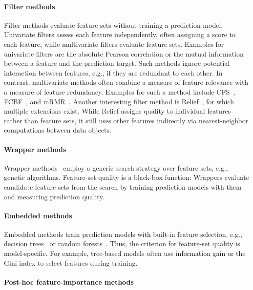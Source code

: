 \documentclass{article}
\theoremstyle{definition}
\begin{document}
\paragraph{Filter methods}

Filter methods evaluate feature sets without training a prediction model.
Univariate filters assess each feature independently, often assigning a score to each feature, while multivariate filters evaluate feature sets.
Examples for univariate filters are the absolute Pearson correlation or the mutual information between a feature and the prediction target.
Such methods ignore potential interaction between features, e.g., if they are redundant to each other.
In contrast, multivariate methods often combine a measure of feature relevance with a measure of feature redundancy.
Examples for such a method include CFS~\cite{hall1999correlation}, FCBF~\cite{yu2003feature}, and mRMR~\cite{peng2005feature}.
Another interesting filter method is Relief~\cite{kira1992feature}, for which multiple extensions exist.
While Relief assigns quality to individual features rather than feature sets, it still uses other features indirectly via nearest-neighbor computations between data objects.

\paragraph{Wrapper methods}

Wrapper methods~\cite{kohavi1997wrappers} employ a generic search strategy over feature sets, e.g., genetic algorithms.
Feature-set quality is a black-box function:
Wrappers evaluate candidate feature sets from the search by training prediction models with them and measuring prediction quality.

\paragraph{Embedded methods}

Embedded methods train prediction models with built-in feature selection, e.g., decision trees~\cite{breiman1984classification} or random forests~\cite{breiman2001random}.
Thus, the criterion for feature-set quality is model-specific.
For example, tree-based models often use information gain or the Gini index to select features during training.

\paragraph{Post-hoc feature-importance methods}
\end{document}
